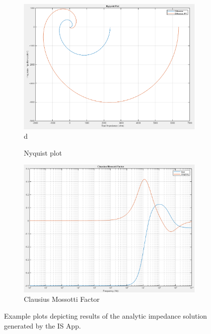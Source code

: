 \begin{figure}[h]
    \\
    \vspace{0.1 in}
    \begin{subfigure}[b]{0.45\textwidth}
        \centering
        \includegraphics[width=\textwidth]{images/IS_APP_Nyquist.png}d
        \caption{Nyquist plot}
    \end{subfigure}
    \hfill
    \begin{subfigure}[b]{0.45\textwidth}
        \centering
        \includegraphics[width=\textwidth]{images/IS_APP_FCM.png}
        \caption{Clausius Mossotti Factor}
    \end{subfigure}
    \caption{Example plots depicting results of the analytic impedance solution generated by the IS App.}
    \label{fig:IS_APP_IS_Results}
\end{figure}


